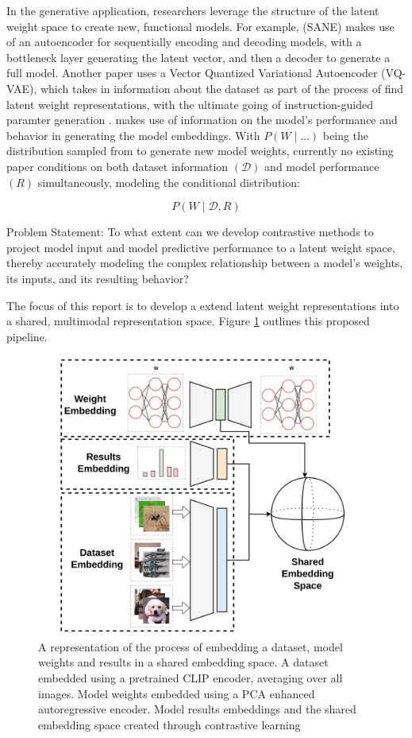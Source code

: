 In the generative application, researchers leverage the structure of the latent weight space to create new, functional models. For example, \cite{schurholt2024scalableversatileweightspace} (SANE) makes use of an autoencoder for sequentially encoding and decoding models, with a bottleneck layer generating the latent vector, and then a decoder to generate a full model. Another paper uses a Vector Quantized Variational Autoencoder (VQ-VAE), which takes in information about the dataset as part of the process of find latent weight representations, with the ultimate going of instruction-guided paramter generation \cite{bedionita2025instructionguidedautoregressiveneuralnetwork}.\cite{meynent2025structureenoughleveragingbehavior} makes use of information on the model's performance and behavior in generating the model embeddings. With $P(W \mid \dots)$ being the distribution sampled from to generate new model weights, currently no existing paper conditions on both dataset information $(\mathcal{D})$ and model performance $(R)$ simultaneously, modeling the conditional distribution:

$$ 
 P(W \mid \mathcal{D} , R)
$$

Problem Statement: To what extent can we develop contrastive methods to project model input and model predictive performance to a latent weight space, thereby accurately modeling the complex relationship between a model's weights, its inputs, and its resulting behavior?

The focus of this report is to develop a extend latent weight representations into a shared, multimodal representation space. Figure \ref{fig:pipeline} outlines this proposed pipeline.

\begin{figure}[!t]
    \centering
    \includegraphics[width=0.75\linewidth]{pipeline.png}
    \caption[A figure illustrating the process of embedding a dataset,model weigths and results into a shared embedding space ]{A representation of the process of embedding a dataset, model weights and results in a shared embedding space. A dataset embedded using a pretrained CLIP encoder, averaging over all images. Model weights embedded using a PCA enhanced autoregressive encoder. Model results embeddings and the shared embedding space created through contrastive learning   }
    \label{fig:pipeline}
\end{figure}

